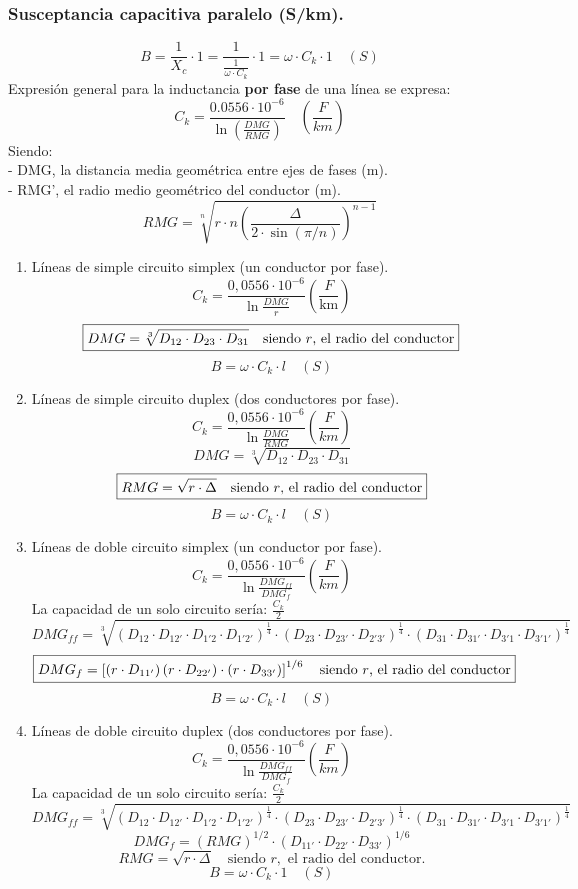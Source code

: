 \documentclass[12pt,a4paper]{article}
\begin{document}
\subsubsection{Susceptancia capacitiva paralelo (S/km).}
\[
\boxed{	 B = \frac{1}{X_c} \cdot 1 = \frac{1}{\frac{1}{\omega \cdot C_k}} \cdot 1 = \omega \cdot C_k \cdot 1 \quad (S)}
\]
Expresión general para la inductancia \textbf{por fase} de una línea se expresa:
\[
\boxed{	C_k = \frac{0.0556 \cdot 10^{-6}}{\ln \left( \frac{DMG}{RMG} \right)} \quad \left( \frac{F}{km} \right)}
\]
Siendo: \\
- DMG, la distancia media geométrica entre ejes de fases (m). \\
- RMG', el radio medio geométrico del conductor (m).
\[
\boxed{	RMG = \sqrt[n]{r \cdot n \left( \frac{\Delta}{2 \cdot \sin(\pi / n)} \right)^{n-1}}}
\]
\begin{enumerate}
	\item Líneas de simple circuito simplex (un conductor por fase).
	\[
	\boxed{	C_k = \frac{0,0556 \cdot 10^{-6}}{\ln \frac{DMG}{r}} \left( \frac{F}{\text{km}} \right)}
	\]
	\[
	\boxed{	DMG = \sqrt[3]{D_{12} \cdot D_{23} \cdot D_{31}} \quad \text{siendo \( r \), el radio del conductor}}
	\]
	\[
	\boxed{	B = \omega \cdot C_k \cdot l \quad (S)}
	\]
	\item Líneas de simple circuito duplex (dos conductores por fase).
	\[
	\boxed{	C_k = \frac{0,0556 \cdot 10^{-6}}{\ln \frac{DMG}{RMG}} \left( \frac{F}{km} \right)}
	\]
	\[
	\boxed{	DMG = \sqrt[3]{D_{12} \cdot D_{23} \cdot D_{31}}}
	\]
	\[
	\boxed{	RMG = \sqrt{r \cdot \Delta} \quad \text{siendo \( r \), el radio del conductor}}
	\]
	\[
	\boxed{	B = \omega \cdot C_k \cdot l \quad (S)}
	\]
	\item Líneas de doble circuito simplex (un conductor por fase).
	\[
	\boxed{	C_k = \frac{0,0556 \cdot 10^{-6}}{\ln \frac{DMG_{ff}}{DMG_f}} \left( \frac{F}{km} \right)}
	\]
	La capacidad de un solo circuito sería: $\boxed{\frac{C_k}{2}}$
	\[
	\boxed{DMG_{ff} = \sqrt[3]{(D_{12}\cdot D_{12'}\cdot D_{1'2}\cdot D_{1'2'})^\frac{1}{4} \cdot (D_{23}\cdot D_{23'}\cdot D_{2'3'})^\frac{1}{4} \cdot (D_{31}\cdot D_{31'}\cdot D_{3'1}\cdot D_{3'1'})^\frac{1}{4}}} 
	\]
	\[
	\boxed{DMG_f = \left[ \left( r \cdot D_{11'} \right) \left( r \cdot D_{22'} \right) \cdot \left( r \cdot D_{33'} \right) \right]^{1/6} \quad \text{siendo \( r \), el radio del conductor}}
	\]
	\[
	\boxed{B = \omega \cdot C_k \cdot l \quad (S)}
	\]
	\item Líneas de doble circuito duplex (dos conductores por fase).
	\[
	\boxed{	C_k = \frac{0,0556 \cdot 10^{-6}}{\ln \frac{DMG_{ff}}{DMG_f}} \left( \frac{F}{km} \right)}
	\]
	La capacidad de un solo circuito sería: $\boxed{\frac{C_k}{2}}$
	\[
	\boxed{DMG_{ff} = \sqrt[3]{(D_{12}\cdot D_{12'}\cdot D_{1'2}\cdot D_{1'2'})^\frac{1}{4} \cdot (D_{23}\cdot D_{23'}\cdot D_{2'3'})^\frac{1}{4} \cdot (D_{31}\cdot D_{31'}\cdot D_{3'1}\cdot D_{3'1'})^\frac{1}{4}}} 
	\]
	\[
	\boxed{	DMG_f = (RMG)^{1/2} \cdot (D_{11'} \cdot D_{22'} \cdot D_{33'})^{1/6}}
	\]
	\[
	\boxed{	RMG = \sqrt{r \cdot \Delta} \quad \text{siendo } r, \text{ el radio del conductor.}}
	\]
	\[
	\boxed{	B = \omega \cdot C_k \cdot 1 \quad (S)}
	\]
\end{enumerate}
\end{document}
